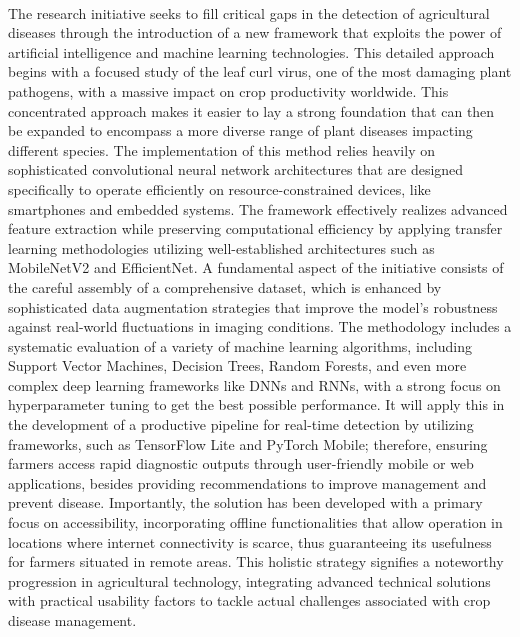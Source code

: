 \

The research initiative seeks to fill critical gaps in the detection of agricultural diseases through the introduction of a new framework that exploits the power of artificial intelligence and machine learning technologies. This detailed approach begins with a focused study of the leaf curl virus, one of the most damaging plant pathogens, with a massive impact on crop productivity worldwide. This concentrated approach makes it easier to lay a strong foundation that can then be expanded to encompass a more diverse range of plant diseases impacting different species. The implementation of this method relies heavily on sophisticated convolutional neural network architectures that are designed specifically to operate efficiently on resource-constrained devices, like smartphones and embedded systems. The framework effectively realizes advanced feature extraction while preserving computational efficiency by applying transfer learning methodologies utilizing well-established architectures such as MobileNetV2 and EfficientNet. A fundamental aspect of the initiative consists of the careful assembly of a comprehensive dataset, which is enhanced by sophisticated data augmentation strategies that improve the model's robustness against real-world fluctuations in imaging conditions. The methodology includes a systematic evaluation of a variety of machine learning algorithms, including Support Vector Machines, Decision Trees, Random Forests, and even more complex deep learning frameworks like DNNs and RNNs, with a strong focus on hyperparameter tuning to get the best possible performance. It will apply this in the development of a productive pipeline for real-time detection by utilizing frameworks, such as TensorFlow Lite and PyTorch Mobile; therefore, ensuring farmers access rapid diagnostic outputs through user-friendly mobile or web applications, besides providing recommendations to improve management and prevent disease. Importantly, the solution has been developed with a primary focus on accessibility, incorporating offline functionalities that allow operation in locations where internet connectivity is scarce, thus guaranteeing its usefulness for farmers situated in remote areas. This holistic strategy signifies a noteworthy progression in agricultural technology, integrating advanced technical solutions with practical usability factors to tackle actual challenges associated with crop disease management.

\

